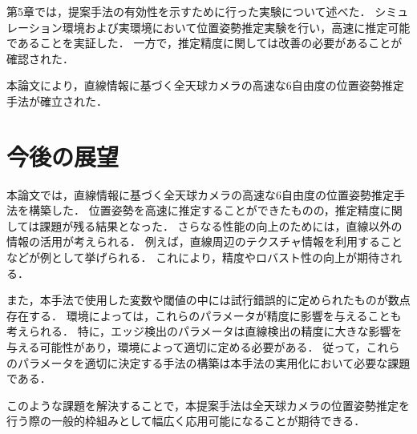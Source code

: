 第5章では，提案手法の有効性を示すために行った実験について述べた．
シミュレーション環境および実環境において位置姿勢推定実験を行い，高速に推定可能であることを実証した．
一方で，推定精度に関しては改善の必要があることが確認された．
\vspace{\baselineskip}

本論文により，直線情報に基づく全天球カメラの高速な6自由度の位置姿勢推定手法が確立された．

\newpage
\section{今後の展望}

本論文では，直線情報に基づく全天球カメラの高速な6自由度の位置姿勢推定手法を構築した．
位置姿勢を高速に推定することができたものの，推定精度に関しては課題が残る結果となった．
さらなる性能の向上のためには，直線以外の情報の活用が考えられる．
例えば，直線周辺のテクスチャ情報を利用することなどが例として挙げられる．
これにより，精度やロバスト性の向上が期待される．
\vspace{\baselineskip}


また，本手法で使用した変数や閾値の中には試行錯誤的に定められたものが数点存在する．
環境によっては，これらのパラメータが精度に影響を与えることも考えられる．
特に，エッジ検出のパラメータは直線検出の精度に大きな影響を与える可能性があり，環境によって適切に定める必要がある．
従って，これらのパラメータを適切に決定する手法の構築は本手法の実用化において必要な課題である．
\vspace{\baselineskip}


このような課題を解決することで，本提案手法は全天球カメラの位置姿勢推定を行う際の一般的枠組みとして幅広く応用可能になることが期待できる．


\newpage

